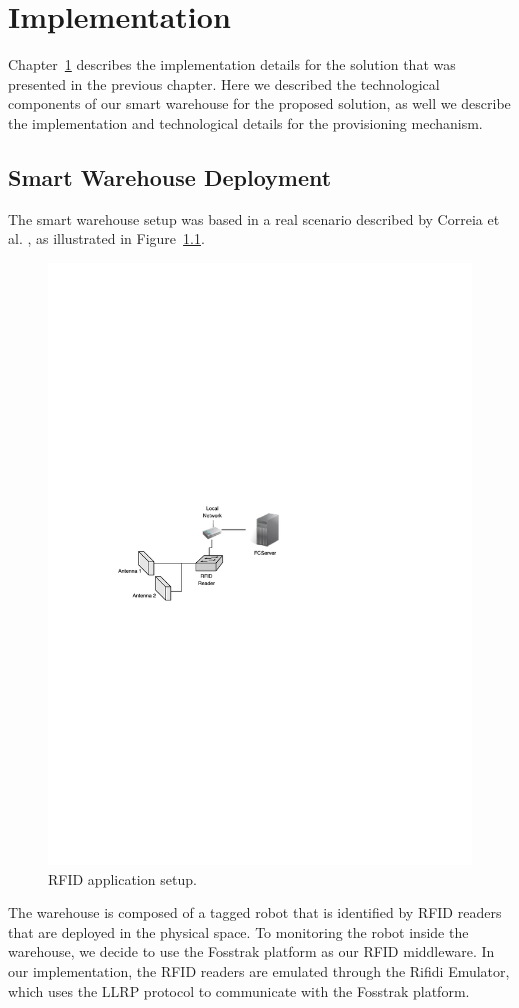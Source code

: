 
\chapter{Implementation}
\label{chapter:implementation}
Chapter~\ref{chapter:implementation} describes the implementation details for the solution that was
presented in the previous chapter. Here we described the technological components of our smart
warehouse for the proposed solution, as well we describe the implementation and technological details
for the provisioning mechanism.

\section{Smart Warehouse Deployment}
\label{sec:Smart Place}
The smart warehouse setup was based in a real scenario described by Correia et al. \cite{correiaalpharfid},
as illustrated in Figure~\ref{fig:rfidapp_setup}.\\

\begin{figure}[ht!]
  \centering
  \includegraphics[width=.6\textwidth]{./images/rfidapp_setup}
  \caption[RFID application setup.]{RFID application setup.}
  \label{fig:rfidapp_setup}
\end{figure}

The warehouse is composed of a tagged robot that is identified by \gls{RFID} readers that are deployed
in the physical space. To monitoring the robot inside the warehouse, we decide to use the Fosstrak
platform as our \gls{RFID} middleware. In our implementation, the \gls{RFID} readers are emulated
through the Rifidi Emulator, which uses the \gls{LLRP} protocol to communicate with the Fosstrak
platform.

